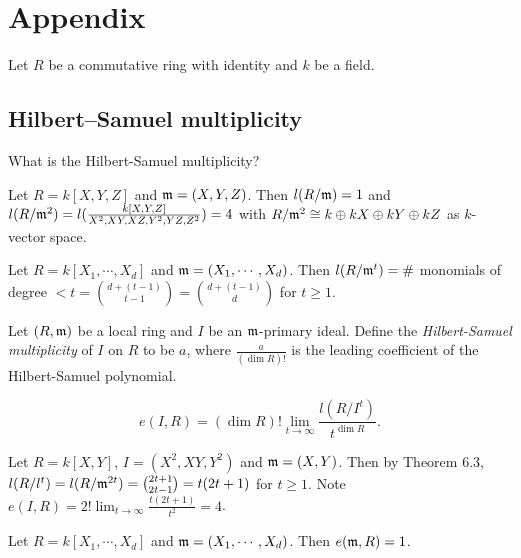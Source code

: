 \chapter{Appendix}

Let $R$ be a commutative ring with identity and $k$ be a field. 

\section*{Hilbert–Samuel multiplicity}

\begin{question}
    What is the Hilbert-Samuel multiplicity? 
\end{question}

\begin{example}
    Let $R = k[X,Y,Z]$ and $\mathfrak{m} = (X,Y,Z)$. Then $l(R/\mathfrak{m}) = 1$ and $l(R/\mathfrak{m}^{2}) = l(\frac{k[X,Y,Z]}{X^{2},XY,XZ,Y^{2},YZ,Z^{2}}) = 4$ with $R/\mathfrak{m}^{2} \cong k \oplus kX \oplus kY \oplus kZ$ as $k$-vector space.
\end{example}

\begin{theorem}
    Let $R = k[X_1,\cdots,X_d]$ and $\mathfrak{m} = (X_1,\cdots,X_d)$. Then $l(R/\mathfrak{m}^{t}) = \#$ monomials of degree  $< t = \binom {d + (t-1)}{t-1} = \binom {d+(t-1)}{d}$ for $t \geq 1$.
\end{theorem}

\begin{definition}
    Let $(R,\mathfrak{m})$ be a local ring and $I$ be an $\mathfrak{m}$-primary ideal. Define the \emph{Hilbert-Samuel multiplicity} of $I$ on $R$ to be $a$, where $\frac{a}{(\dim R)!}$ is the leading coefficient of the Hilbert-Samuel polynomial.
\end{definition}

\begin{definition}
    \[e(I,R) = (\dim R)! \lim_{t \to \infty} \frac{l(R/I^{t})}{t^{\dim R}}.\]
\end{definition}

\begin{example}
    Let $R = k[X,Y]$, $I = (X^{2},XY,Y^{2})$ and $\mathfrak{m} = (X,Y)$. Then by Theorem 6.3, $l(R/l^{t}) = l(R/\mathfrak{m}^{2t}) = \binom {2t+1}{2t-1} = t(2t+1)$ for $t \geq 1$. Note $e(I,R) = 2! \lim_{t \to \infty} \frac{t(2t+1)}{t^{2}} = 4$.
\end{example}

\begin{fact}
    Let $R = k[X_1,\cdots,X_d]$ and $\mathfrak{m} = (X_1,\cdots,X_d)$. Then $e(\mathfrak{m},R) = 1$.
\end{fact}


